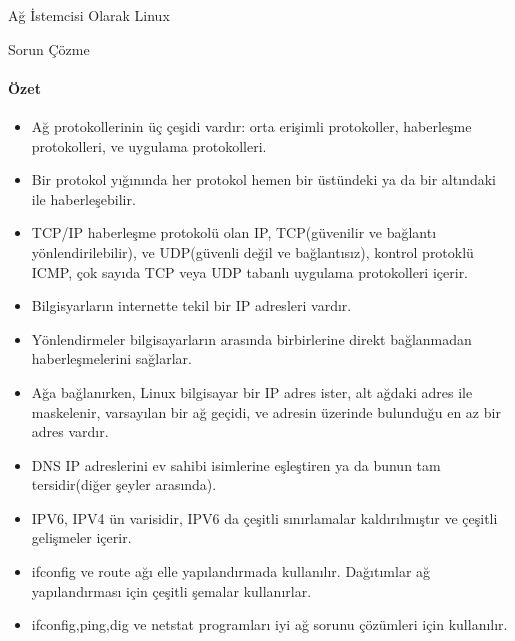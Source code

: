 \begin{section}{Ağ İstemcisi Olarak Linux}
\begin{subsection}{Sorun Çözme}
\paragraph{Özet}{
\begin{itemize}
\item Ağ protokollerinin üç çeşidi vardır: orta erişimli protokoller, haberleşme protokolleri, ve uygulama protokolleri.
\item Bir protokol yığınında her protokol hemen bir üstündeki ya da bir altındaki ile haberleşebilir.
\item TCP/IP haberleşme protokolü olan IP, TCP(güvenilir ve bağlantı yönlendirilebilir), ve UDP(güvenli değil ve bağlantısız), kontrol protoklü ICMP, çok sayıda TCP veya UDP tabanlı uygulama protokolleri içerir.
\item Bilgisyarların internette tekil bir IP adresleri vardır.
\item Yönlendirmeler bilgisayarların arasında birbirlerine direkt bağlanmadan haberleşmelerini sağlarlar.
\item Ağa bağlanırken, Linux bilgisayar bir IP adres ister, alt ağdaki adres ile maskelenir, varsayılan bir ağ geçidi, ve adresin üzerinde bulunduğu en az bir adres vardır. 
\item DNS IP adreslerini ev sahibi isimlerine eşleştiren ya da bunun tam tersidir(diğer şeyler arasında).
\item IPV6, IPV4 ün varisidir,  IPV6 da çeşitli sınırlamalar kaldırılmıştır ve çeşitli gelişmeler içerir. 
\item ifconfig ve route ağı elle yapılandırmada kullanılır. Dağıtımlar ağ yapılandırması için çeşitli şemalar kullanırlar. 
\item ifconfig,ping,dig ve netstat programları iyi ağ sorunu çözümleri için kullanılır.
\end{itemize}
}
\end{subsection}
\end{section}